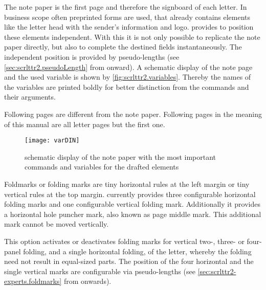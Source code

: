 The note paper is the first page and therefore the signboard of each
letter. In business scope often preprinted forms are used, that already
contains elements like the letter head with the sender's information and
logo. \KOMAScript{} provides to position these elements independent. With this
it is not only possible to replicate the note paper directly, but also to
complete the destined fields instantaneously. The independent position is
provided by pseudo-lengths (see \autoref{sec:scrlttr2.pseudoLength} from
 onward). A schematic display of the
note page and the used variable is shown by
\autoref{fig:scrlttr2.variables}. Thereby the names of the variables are
printed boldly for better distinction from the commands and their arguments.

Following pages are different from
the note paper. Following pages in the meaning of this manual are all letter
pages but the first one.

\begin{figure}
  \centering
  \texttt{[image: varDIN]}
  \caption{schematic display of the note paper with the most important
    commands and variables for the drafted elements}
  \label{fig:scrlttr2.variables}
\end{figure}

\begin{Declaration}
\end{Declaration}
%
Foldmarks or folding marks are tiny
horizontal rules at the left margin or tiny vertical rules at the top
margin. \KOMAScript{} currently provides three configurable horizontal folding
marks and one configurable vertical folding mark. Additionally it provides a
horizontal hole puncher mark, also known as page middle mark. This additional
mark cannot be moved vertically.

This option activates or deactivates folding marks for vertical
two-, three- or four-panel folding, and a single horizontal folding, of the
letter, whereby the folding need not result in equal-sized parts. The position
of the four horizontal and the single vertical marks are configurable via
pseudo-lengths (see \autoref{sec:scrlttr2-experts.foldmarks} from
 onwards).

